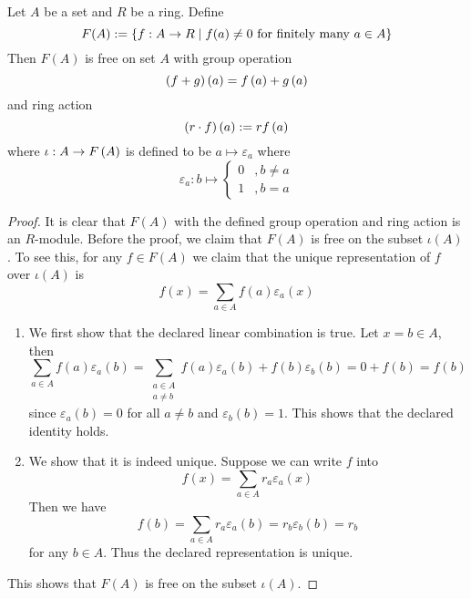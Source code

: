 \begin{thm}
    Let $A$ be a set and $R$ be a ring. Define
    \[F(A):= \left\{f:A\to R \mid  f(a)\neq 0 \text{ for finitely many }a\in A\right\}\]
    Then $F(A)$ is free on set $A$ with group operation
    \[\left(f+g\right)\left(a\right) = f \left(a\right) + g \left(a\right)\]
    and ring action
    \[\left(r\cdot f\right) \left(a\right):= rf \left(a\right)\]
    where $\iota:A\to F \left(A\right)$ is defined to be $a\mapsto \varepsilon_a$ where
    \[\varepsilon_a:b\mapsto 
    \begin{cases}
        0 & ,b\neq a\\
        1 & , b=a
    \end{cases}\]
\end{thm}
\begin{proof}
    It is clear that $F(A)$ with the defined group operation and ring action is an $R$-module. Before the proof, we claim that $F(A)$ is free on the subset $\iota(A)$. To see this, for any $f\in F(A)$ we claim that the unique representation of $f$ over $\iota(A)$ is 
    \[f(x) =\sum_{a\in A} f(a)\varepsilon_a(x)\]
    \begin{enumerate}
        \item We first show that the declared linear combination is true. Let $x=b\in A$, then 
        \[\sum_{a\in A}f(a) \varepsilon_a(b) = \sum_{\substack{a\in A\\ a\neq b}}f(a) \varepsilon_a(b) + f(b) \varepsilon_b(b) = 0 + f(b)=f(b)\]
        since $\varepsilon_a(b)=0$ for all $a\neq b$ and $\varepsilon_b(b) = 1$. This shows that the declared identity holds.
        \item We show that it is indeed unique. Suppose we can write $f$ into 
        \[f(x) = \sum_{a\in A}r_a \varepsilon_a(x)\]
        Then we have 
        \[ f(b) = \sum_{a\in A} r_a \varepsilon_a(b) = r_b\varepsilon_b(b) = r_b\]
        for any $b\in A$. Thus the declared representation is unique.
    \end{enumerate}
    This shows that $F(A)$ is free on the subset $\iota(A)$. 


\end{proof}
